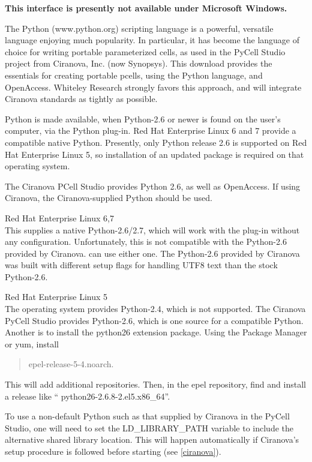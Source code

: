 {\bf This interface is presently not available under Microsoft Windows.}

The Python ({\vt www.python.org}) scripting language is a powerful,
versatile language enjoying much popularity.  In particular, it has
become the language of choice for writing portable parameterized
cells, as used in the PyCell Studio project from Ciranova, Inc.  (now
Synopsys).
This download provides the essentials for creating portable pcells,
using the Python language, and OpenAccess.  Whiteley Research strongly
favors this approach, and will integrate Ciranova standards as tightly
as possible.

Python is made available, when Python-2.6 or newer is found on the
user's computer, via the Python plug-in.  Red Hat Enterprise Linux 6
and 7 provide a compatible native Python.  Presently, only Python
release 2.6 is supported on Red Hat Enterprise Linux 5, so
installation of an updated package is required on that operating
system.

The Ciranova PCell Studio provides Python 2.6, as well as OpenAccess. 
If using Ciranova, the Ciranova-supplied Python should be used.

\begin{description}
\item{Red Hat Enterprise Linux 6,7}\\
This supplies a native Python-2.6/2.7, which will work with the
plug-in without any configuration.
Unfortunately, this is not compatible with the Python-2.6 provided by
Ciranova.  {\Xic} can use either one.  The Python-2.6 provided by
Ciranova was built with different setup flags for handling UTF8 text
than the stock Python-2.6.

\item{Red Hat Enterprise Linux 5}\\
The operating system provides Python-2.4, which is not supported.  The
Ciranova PyCell Studio provides Python-2.6, which is one source for a
compatible Python.  Another is to install the {\vt python26} extension
package.  Using the {\cb Package Manager} or {\vt yum}, install
\begin{quote}
{\vt epel-release-5-4.noarch}.
\end{quote}
This will add additional repositories.  Then, in the {\vt epel}
repository, find and install a release like ``{\vt
python26-2.6.8-2.el5.x86\_64}''.
\end{description}

To use a non-default Python such as that supplied by Ciranova in the
PyCell Studio, one will need to set the {\et LD\_LIBRARY\_PATH}
variable to include the alternative shared library location.
This will happen automatically if Ciranova's setup procedure is
followed before starting {\Xic} (see \ref{ciranova}).

